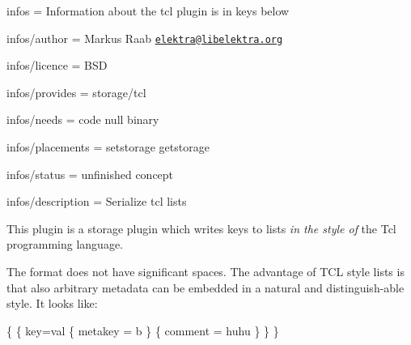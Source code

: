 
\begin{DoxyItemize}
\item infos = Information about the tcl plugin is in keys below
\item infos/author = Markus Raab \href{mailto:elektra@libelektra.org}{\tt elektra@libelektra.\+org}
\item infos/licence = B\+SD
\item infos/provides = storage/tcl
\item infos/needs = code null binary
\item infos/placements = setstorage getstorage
\item infos/status = unfinished concept
\item infos/description = Serialize tcl lists
\end{DoxyItemize}

This plugin is a storage plugin which writes keys to lists {\itshape in the style of} the Tcl programming language.

The format does not have significant spaces. The advantage of T\+CL style lists is that also arbitrary metadata can be embedded in a natural and distinguish-\/able style. It looks like\+:


\begin{DoxyCode}
\{
    \{
        key=val
        \{
            metakey = b
        \}
        \{
            comment = huhu
        \}
    \}
\}
\end{DoxyCode}


